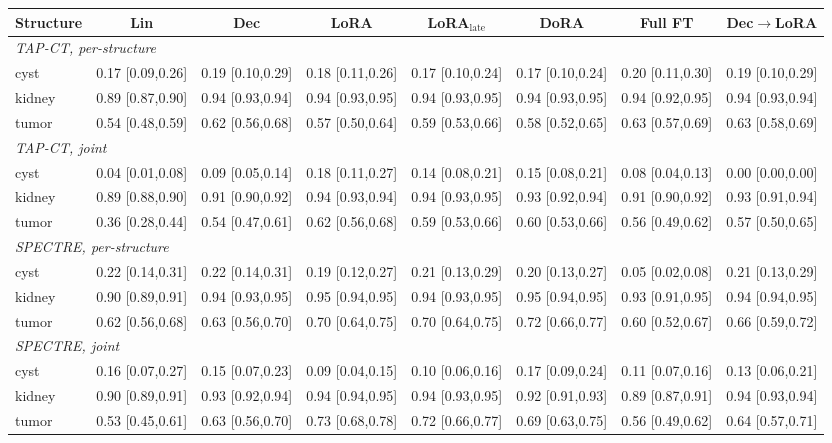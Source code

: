 \begin{tabular}{lccccccc}
\toprule
Structure & Lin & Dec & LoRA & LoRA$_{\text{late}}$ & DoRA & Full FT & Dec$\to$LoRA \\
\midrule
\multicolumn{8}{l}{\textit{TAP-CT, per-structure}} \\
cyst & 0.17 [0.09,0.26] & 0.19 [0.10,0.29] & 0.18 [0.11,0.26] & 0.17 [0.10,0.24] & 0.17 [0.10,0.24] & 0.20 [0.11,0.30] & 0.19 [0.10,0.29] \\
kidney & 0.89 [0.87,0.90] & 0.94 [0.93,0.94] & 0.94 [0.93,0.95] & 0.94 [0.93,0.95] & 0.94 [0.93,0.95] & 0.94 [0.92,0.95] & 0.94 [0.93,0.94] \\
tumor & 0.54 [0.48,0.59] & 0.62 [0.56,0.68] & 0.57 [0.50,0.64] & 0.59 [0.53,0.66] & 0.58 [0.52,0.65] & 0.63 [0.57,0.69] & 0.63 [0.58,0.69] \\
\multicolumn{8}{l}{\textit{TAP-CT, joint}} \\
cyst & 0.04 [0.01,0.08] & 0.09 [0.05,0.14] & 0.18 [0.11,0.27] & 0.14 [0.08,0.21] & 0.15 [0.08,0.21] & 0.08 [0.04,0.13] & 0.00 [0.00,0.00] \\
kidney & 0.89 [0.88,0.90] & 0.91 [0.90,0.92] & 0.94 [0.93,0.94] & 0.94 [0.93,0.95] & 0.93 [0.92,0.94] & 0.91 [0.90,0.92] & 0.93 [0.91,0.94] \\
tumor & 0.36 [0.28,0.44] & 0.54 [0.47,0.61] & 0.62 [0.56,0.68] & 0.59 [0.53,0.66] & 0.60 [0.53,0.66] & 0.56 [0.49,0.62] & 0.57 [0.50,0.65] \\
\multicolumn{8}{l}{\textit{SPECTRE, per-structure}} \\
cyst & 0.22 [0.14,0.31] & 0.22 [0.14,0.31] & 0.19 [0.12,0.27] & 0.21 [0.13,0.29] & 0.20 [0.13,0.27] & 0.05 [0.02,0.08] & 0.21 [0.13,0.29] \\
kidney & 0.90 [0.89,0.91] & 0.94 [0.93,0.95] & 0.95 [0.94,0.95] & 0.94 [0.93,0.95] & 0.95 [0.94,0.95] & 0.93 [0.91,0.95] & 0.94 [0.94,0.95] \\
tumor & 0.62 [0.56,0.68] & 0.63 [0.56,0.70] & 0.70 [0.64,0.75] & 0.70 [0.64,0.75] & 0.72 [0.66,0.77] & 0.60 [0.52,0.67] & 0.66 [0.59,0.72] \\
\multicolumn{8}{l}{\textit{SPECTRE, joint}} \\
cyst & 0.16 [0.07,0.27] & 0.15 [0.07,0.23] & 0.09 [0.04,0.15] & 0.10 [0.06,0.16] & 0.17 [0.09,0.24] & 0.11 [0.07,0.16] & 0.13 [0.06,0.21] \\
kidney & 0.90 [0.89,0.91] & 0.93 [0.92,0.94] & 0.94 [0.94,0.95] & 0.94 [0.93,0.95] & 0.92 [0.91,0.93] & 0.89 [0.87,0.91] & 0.94 [0.93,0.94] \\
tumor & 0.53 [0.45,0.61] & 0.63 [0.56,0.70] & 0.73 [0.68,0.78] & 0.72 [0.66,0.77] & 0.69 [0.63,0.75] & 0.56 [0.49,0.62] & 0.64 [0.57,0.71] \\
\bottomrule
\end{tabular}
